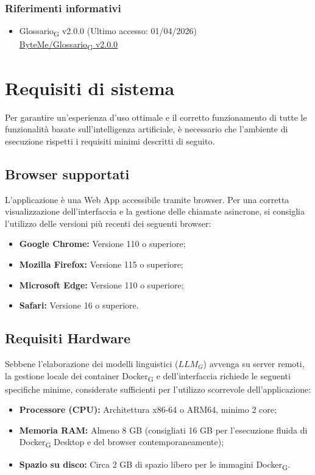 \documentclass[11pt,a4paper]{article}
\newcommand{\gls}[1]{#1\textsubscript{G}}
\begin{document}
\subsubsection{Riferimenti informativi}
\begin{itemize}
    \item \gls{Glossario} v2.0.0 (Ultimo accesso: 01/04/2026)\\
    \href{https://byteme25.github.io/ByteMe/files.html}{ByteMe/\gls{Glossario} v2.0.0}
\end{itemize}

\newpage

\section{Requisiti di sistema}
Per garantire un'esperienza d'uso ottimale e il corretto funzionamento di tutte le funzionalità basate sull'intelligenza artificiale, è necessario che l'ambiente di esecuzione rispetti i requisiti minimi descritti di seguito.

\subsection{Browser supportati}
L'applicazione è una Web App accessibile tramite browser. Per una corretta visualizzazione dell'interfaccia e la gestione delle chiamate asincrone, si consiglia l'utilizzo delle versioni più recenti dei seguenti browser:
\begin{itemize}
    \item \textbf{Google Chrome:} Versione 110 o superiore;
    \item \textbf{Mozilla Firefox:} Versione 115 o superiore;
    \item \textbf{Microsoft Edge:} Versione 110 o superiore;
    \item \textbf{Safari:} Versione 16 o superiore.
\end{itemize}

\subsection{Requisiti Hardware}
Sebbene l'elaborazione dei modelli linguistici ($LLM_G$) avvenga su server remoti, la gestione locale dei container \gls{Docker} e dell'interfaccia richiede le seguenti specifiche minime, considerate sufficienti per l'utilizzo scorrevole dell'applicazione:
\begin{itemize}
    \item \textbf{Processore (CPU):} Architettura x86-64 o ARM64, minimo 2 core;
    \item \textbf{Memoria RAM:} Almeno 8 GB (consigliati 16 GB per l'esecuzione fluida di \gls{Docker} Desktop e del browser contemporaneamente);
    \item \textbf{Spazio su disco:} Circa 2 GB di spazio libero per le immagini \gls{Docker}.
\end{itemize}
\end{document}
